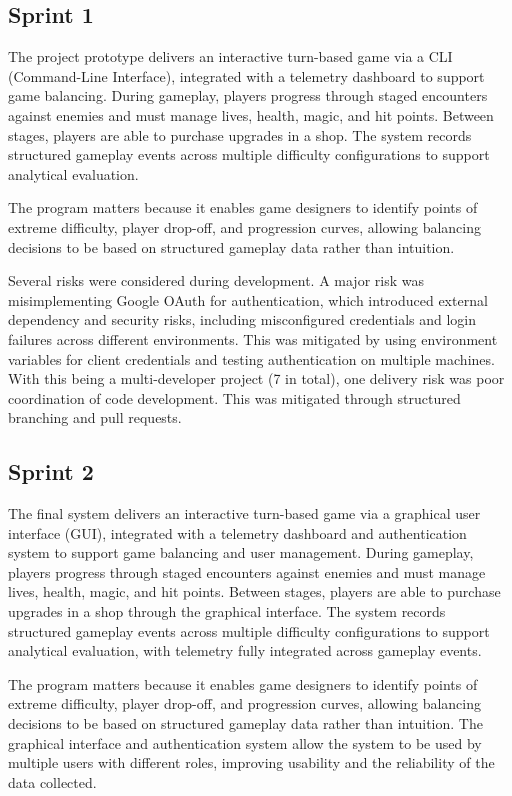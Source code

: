 
\subsection{Sprint 1}
The project prototype delivers an interactive turn-based game via a CLI (Command-Line Interface), integrated with a telemetry dashboard to support game balancing. During gameplay, players progress through staged encounters against enemies and must manage lives, health, magic, and hit points. Between stages, players are able to purchase upgrades in a shop. The system records structured gameplay events across multiple difficulty configurations to support analytical evaluation.

The program matters because it enables game designers to identify points of extreme difficulty, player drop-off, and progression curves, allowing balancing decisions to be based on structured gameplay data rather than intuition.

Several risks were considered during development. A major risk was misimplementing Google OAuth for authentication, which introduced external dependency and security risks, including misconfigured credentials and login failures across different environments. This was mitigated by using environment variables for client credentials and testing authentication on multiple machines. With this being a multi-developer project (7 in total), one delivery risk was poor coordination of code development. This was mitigated through structured branching and pull requests.

\subsection{Sprint 2}

The final system delivers an interactive turn-based game via a graphical user interface (GUI), integrated with a telemetry dashboard and authentication system to support game balancing and user management. During gameplay, players progress through staged encounters against enemies and must manage lives, health, magic, and hit points. Between stages, players are able to purchase upgrades in a shop through the graphical interface. The system records structured gameplay events across multiple difficulty configurations to support analytical evaluation, with telemetry fully integrated across gameplay events.

The program matters because it enables game designers to identify points of extreme difficulty, player drop-off, and progression curves, allowing balancing decisions to be based on structured gameplay data rather than intuition. The graphical interface and authentication system allow the system to be used by multiple users with different roles, improving usability and the reliability of the data collected.

